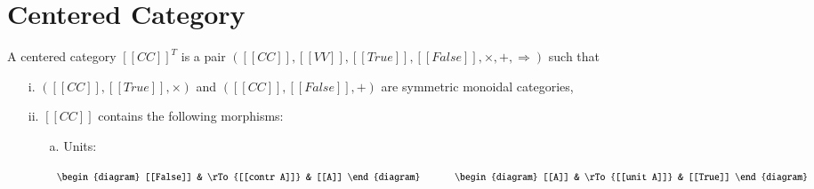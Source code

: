 \documentclass{article}
\newcommand{\To}[0]{\Rightarrow}
\begin{document}
\section{Centered Category}
\label{sec:centered_category}
\begin{definition}
  \label{def:centered_cate}
  A centered category $[[CC]]^T$ is a pair $([[CC]], [[VV]], [[True]], [[False]], \times, +, \To)$
  such that 
  \begin{center}
    \begin{itemize}
    \item[i.] $([[CC]], [[True]], \times)$ and $([[CC]], [[False]], +)$ are symmetric 
      monoidal categories,
    \item[ii.] $[[CC]]$ contains the following morphisms:
      \begin{center}
        \begin{itemize}
        \item[a.] Units:
          \begin{center}
            \begin{math}
              \begin{array}{lll}
                \begin{diagram}
                  [[False]] & \rTo{[[contr A]]} & [[A]]
                \end{diagram}
                & \ \ \ \ \ \ &
                \begin{diagram}
                  [[A]] & \rTo{[[unit A]]} & [[True]]
                \end{diagram}                
              \end{array}
            \end{math}
          \end{center}


\end{itemize}
\end{center}
\end{itemize}
\end{center}
\end{definition}
\end{document}
